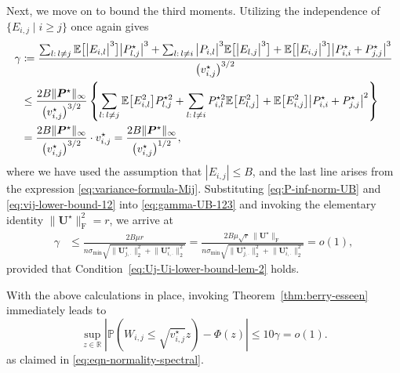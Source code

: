 Next, we move on to bound the third moments. 
Utilizing the independence of $\{E_{i,j}\mid i\geq j\}$ once again gives
%
\begin{align}
	\gamma & \coloneqq\frac{\sum_{l:\,l\neq j}\mathbb{E}\big[\big|E_{i,l}\big|^{3}\big]\big|P_{l,j}^{\star} \big|^{3}+\sum_{l:\,l\neq i}\big|P_{i,l}\big|^{3}\mathbb{E}\big[\big|E_{l,j}\big|^{3}\big]+\mathbb{E}\big[\big|E_{i,j}\big|^{3}\big]\big|P_{i,i}^{\star} +P_{j,j}^{\star} \big|^{3}}{\big(v_{i,j}^{\star}\big)^{3/2}} \notag\\
 & \leq\frac{2B\|\bm{P}^{\star} \|_{\infty}}{\big(v_{i,j}^{\star}\big)^{3/2}}\left\{ \sum_{l:\,l\neq j}\mathbb{E}\big[E_{i,l}^{2}\big] P_{l,j}^{\star 2}+\sum_{l:\,l\neq i} P_{i,l}^{\star 2}\mathbb{E}\big[E_{l,j}^{2}\big]+\mathbb{E}\big[E_{i,j}^{2}\big]\big|P_{i,i}^{\star} +P_{j,j}^{\star} \big|^{2}\right\} \notag\\
 & =\frac{2B\|\bm{P}^{\star} \|_{\infty}}{\big(v_{i,j}^{\star}\big)^{3/2}}\cdot v_{i,j}^{\star}=\frac{2B\|\bm{P}^{\star} \|_{\infty}}{\big(v_{i,j}^{\star}\big)^{1/2}}, 
	\label{eq:gamma-UB-123}
\end{align}
% 
where we have used the assumption that $|E_{i,j}|\leq B$, and the last line arises from the expression \eqref{eq:variance-formula-Mij}. 
Substituting \eqref{eq:P-inf-norm-UB} and \eqref{eq:vij-lower-bound-12} into \eqref{eq:gamma-UB-123} and invoking the elementary identity $\|\bm{U}^{\star} \|_{\mathrm{F}}^2=r$, 
we arrive at
%
\begin{align*}
\gamma & \leq\frac{2B\mu r}{n\sigma_{\min}\sqrt{\big\|\bm{U}_{j,\cdot}^{\star}\big\|_{2}^{2}+\big\|\bm{U}_{i,\cdot}^{\star}\big\|_{2}^{2}}}=\frac{2B\mu\sqrt{r}\,\big\|\bm{U}^{\star}\big\|_{\mathrm{F}}}{n\sigma_{\min}\sqrt{\big\|\bm{U}_{j,\cdot}^{\star}\big\|_{2}^{2}+\big\|\bm{U}_{i,\cdot}^{\star}\big\|_{2}^{2}}}
	= o(1),
\end{align*}
%
provided that Condition~\eqref{eq:Uj-Ui-lower-bound-lem-2} holds. 


With the above calculations in place, invoking Theorem~\ref{thm:berry-esseen} immediately leads to 
%
\[
\sup_{z\in\mathbb{R}}\left|\mathbb{P}\left( W_{i,j}\leq\sqrt{v_{i,j}^{\star}}z\right) -\Phi(z)\right|\leq10\gamma=o(1). 
\]
%
as claimed in \eqref{eq:eqn-normality-spectral}. 



